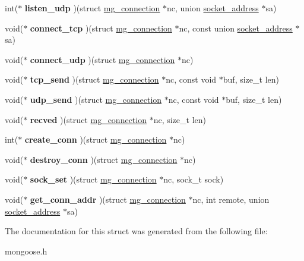 \begin{DoxyCompactItemize}
int($\ast$ {\bfseries listen\+\_\+udp} )(struct \hyperlink{structmg__connection}{mg\+\_\+connection} $\ast$nc, union \hyperlink{unionsocket__address}{socket\+\_\+address} $\ast$sa)
\item 
\mbox{\label{structmg__iface__vtable_a9dfae9823c533b3a3cf22501f7794f0a}} 
void($\ast$ {\bfseries connect\+\_\+tcp} )(struct \hyperlink{structmg__connection}{mg\+\_\+connection} $\ast$nc, const union \hyperlink{unionsocket__address}{socket\+\_\+address} $\ast$sa)
\item 
\mbox{\label{structmg__iface__vtable_a254b3a4b9c6d71ad2e28b634938ff039}} 
void($\ast$ {\bfseries connect\+\_\+udp} )(struct \hyperlink{structmg__connection}{mg\+\_\+connection} $\ast$nc)
\item 
\mbox{\label{structmg__iface__vtable_a73eaa7dd92a2be5503f947972deb3e2c}} 
void($\ast$ {\bfseries tcp\+\_\+send} )(struct \hyperlink{structmg__connection}{mg\+\_\+connection} $\ast$nc, const void $\ast$buf, size\+\_\+t len)
\item 
\mbox{\label{structmg__iface__vtable_a0b9b282504e25ca9d64fcd2425a5fe41}} 
void($\ast$ {\bfseries udp\+\_\+send} )(struct \hyperlink{structmg__connection}{mg\+\_\+connection} $\ast$nc, const void $\ast$buf, size\+\_\+t len)
\item 
\mbox{\label{structmg__iface__vtable_af8c7c999331da0f1d0ac1fda3846b61d}} 
void($\ast$ {\bfseries recved} )(struct \hyperlink{structmg__connection}{mg\+\_\+connection} $\ast$nc, size\+\_\+t len)
\item 
\mbox{\label{structmg__iface__vtable_a06792b088f508f37cca62ffa1a6ca133}} 
int($\ast$ {\bfseries create\+\_\+conn} )(struct \hyperlink{structmg__connection}{mg\+\_\+connection} $\ast$nc)
\item 
\mbox{\label{structmg__iface__vtable_a807f493abe8b61ee2188b36a16a5ecd0}} 
void($\ast$ {\bfseries destroy\+\_\+conn} )(struct \hyperlink{structmg__connection}{mg\+\_\+connection} $\ast$nc)
\item 
\mbox{\label{structmg__iface__vtable_a1cca4d335d41b5f40573a657fa022575}} 
void($\ast$ {\bfseries sock\+\_\+set} )(struct \hyperlink{structmg__connection}{mg\+\_\+connection} $\ast$nc, sock\+\_\+t sock)
\item 
\mbox{\label{structmg__iface__vtable_a7b83f83b265b8d10bb85fafd726aab9d}} 
void($\ast$ {\bfseries get\+\_\+conn\+\_\+addr} )(struct \hyperlink{structmg__connection}{mg\+\_\+connection} $\ast$nc, int remote, union \hyperlink{unionsocket__address}{socket\+\_\+address} $\ast$sa)
\end{DoxyCompactItemize}


The documentation for this struct was generated from the following file\+:\begin{DoxyCompactItemize}
\item 
mongoose.\+h\end{DoxyCompactItemize}

